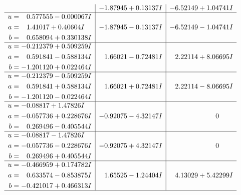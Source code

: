\documentclass[1p]{elsarticle_modified}
\theoremstyle{definition}
\begin{document}
$$\begin{array}{c|c|c}
 & -1.87945 + 0.13137 I & -6.52149 + 1.04741 I \\ \hline\begin{aligned}
u &= \phantom{-}0.577555 - 0.000067 I \\
a &= \phantom{-}1.41017 + 0.40604 I \\
b &= \phantom{-}0.658094 + 0.330138 I\end{aligned}
 & -1.87945 - 0.13137 I & -6.52149 - 1.04741 I \\ \hline\begin{aligned}
u &= -0.212379 + 0.509259 I \\
a &= \phantom{-}0.591841 - 0.588134 I \\
b &= -1.201120 + 0.022464 I\end{aligned}
 & \phantom{-}1.66021 - 0.72481 I & \phantom{-}2.22114 + 8.06695 I \\ \hline\begin{aligned}
u &= -0.212379 - 0.509259 I \\
a &= \phantom{-}0.591841 + 0.588134 I \\
b &= -1.201120 - 0.022464 I\end{aligned}
 & \phantom{-}1.66021 + 0.72481 I & \phantom{-}2.22114 - 8.06695 I \\ \hline\begin{aligned}
u &= -0.08817 + 1.47826 I \\
a &= -0.057736 + 0.228676 I \\
b &= \phantom{-}0.269496 - 0.405544 I\end{aligned}
 & -0.92075 - 4.32147 I & \phantom{-0.000000 } 0 \\ \hline\begin{aligned}
u &= -0.08817 - 1.47826 I \\
a &= -0.057736 - 0.228676 I \\
b &= \phantom{-}0.269496 + 0.405544 I\end{aligned}
 & -0.92075 + 4.32147 I & \phantom{-0.000000 } 0 \\ \hline\begin{aligned}
u &= -0.466959 + 0.174782 I \\
a &= \phantom{-}0.633574 - 0.853875 I \\
b &= -0.421017 + 0.466313 I\end{aligned}
 & \phantom{-}1.65525 - 1.24404 I & \phantom{-}4.13029 + 5.42299 I\\
 \hline 
 \end{array}$$\newpage$$\begin{array}{c|c|c}  

\end{array}$$
\end{document}
